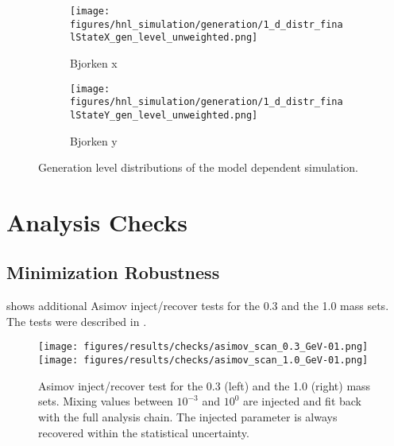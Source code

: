 \begin{figure*}[h]
    \centering
    \begin{subfigure}{0.49\linewidth}
        \texttt{[image: figures/hnl\_simulation/generation/1\_d\_distr\_finalStateX\_gen\_level\_unweighted.png]}
        \caption{Bjorken x}
    \end{subfigure}
    \begin{subfigure}{0.49\linewidth}
    \texttt{[image: figures/hnl\_simulation/generation/1\_d\_distr\_finalStateY\_gen\_level\_unweighted.png]}
        \caption{Bjorken y}
    \end{subfigure}
    \caption[Model dependent simulation generation level distributions]{Generation level distributions of the model dependent simulation.}
\end{figure*}


\chapter{Analysis Checks}


\section{Minimization Robustness} 

 shows additional Asimov inject/recover tests for the \SI{0.3}{\gev} and the \SI{1.0}{\gev} mass sets. The tests were described in .

\begin{figure*}[h]
    \texttt{[image: figures/results/checks/asimov\_scan\_0.3\_GeV-01.png]}
    \texttt{[image: figures/results/checks/asimov\_scan\_1.0\_GeV-01.png]}
	\caption[Asimov inject/recover test (\SI{0.3}{\gev}, \SI{1.0}{\gev})]{Asimov inject/recover test for the \SI{0.3}{\gev} (left) and the \SI{1.0}{\gev} (right) mass sets. Mixing values between $10^{-3}$ and $10^{0}$ are injected and fit back with the full analysis chain. The injected parameter is always recovered within the statistical uncertainty.}
\end{figure*}



